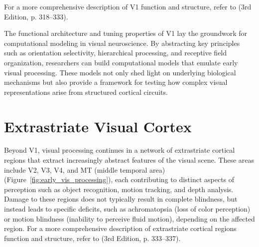 For a more comprehensive description of V1 function and structure, refer to \citet{bear2020neuroscience} (3rd Edition, p. 318--333).

The functional architecture and tuning properties of V1 lay the groundwork for computational modeling in visual neuroscience. By abstracting key principles such as orientation selectivity, hierarchical processing, and receptive field organization, researchers can build computational models that emulate early visual processing. These models not only shed light on underlying biological mechanisms but also provide a framework for testing how complex visual representations arise from structured cortical circuits.

\section{Extrastriate Visual Cortex}
\label{sec:extrastriate}

Beyond V1, visual processing continues in a network of extrastriate cortical regions that extract increasingly abstract features of the visual scene. These areas include V2, V3, V4, and MT (middle temporal area) (Figure~\ref{fig:early_vis_processing}), each contributing to distinct aspects of perception such as object recognition, motion tracking, and depth analysis. Damage to these regions does not typically result in complete blindness, but instead leads to specific deficits, such as achromatopsia (loss of color perception) or motion blindness (inability to perceive fluid motion), depending on the affected region. For a more comprehensive description of extrastriate cortical regions function and structure, refer to \citet{bear2020neuroscience} (3rd Edition, p. 333--337).